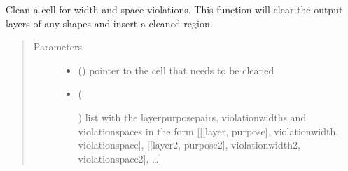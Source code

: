 \documentclass[a4paper,10pt,english]{sphinxmanual}
\begin{document}
\begin{fulllineitems}
\label{\detokenize{drc/drc:kppc.drc.clean}}
Clean a cell for width and space violations.
This function will clear the output layers of any shapes and insert a cleaned region.
\begin{quote}\begin{description}
\item[{Parameters}] \leavevmode\begin{itemize}
\item {} 
 () \textendash{} pointer to the cell that needs to be cleaned

\item {} 
 (%
\begin{footnote}[6]\sphinxAtStartFootnote
{}
%
\end{footnote}) \textendash{} list with the layerpurposepairs, violationwidths and violationspaces in the form {[}{[}{[}layer,
purpose{]}, violationwidth, violationspace{]}, {[}{[}layer2, purpose2{]}, violationwidth2, violationspace2{]}, …{]}

\end{itemize}

\end{description}\end{quote}

\end{fulllineitems}

\end{document}
